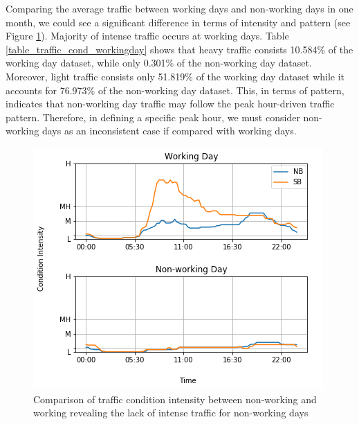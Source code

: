 Comparing the average traffic between working days and non-working days in one month, we could see a significant difference in terms of intensity and pattern (see Figure \ref{figure_workingday_comparison}). Majority of intense traffic occurs at working days. Table \ref{table_traffic_cond_workingday} shows that heavy traffic consists 10.584\% of the working day dataset, while only 0.301\% of the non-working day dataset. Moreover, light traffic consists only 51.819\% of the working day dataset while it accounts for 76.973\% of the non-working day dataset. This, in terms of pattern, indicates that non-working day traffic may follow the peak hour-driven traffic pattern. Therefore, in defining a specific peak hour, we must consider non-working days as an inconsistent case if compared with working days.


\begin{figure}
  \includegraphics[width=\linewidth]{figures/figure_workingday_comparison.png}
  \caption{Comparison of traffic condition intensity between non-working and working revealing the lack of intense traffic for non-working days}
  \label{figure_workingday_comparison}
\end{figure}


